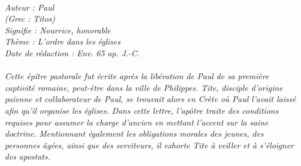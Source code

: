 \BFont
\noindent\hrulefill
{\footnotesize
\textit{
\bigskip
{\centering{}
\\Auteur : Paul
\\(Grec : Titos)
\\Signifie : Nourrice, honorable
\\Thème : L'ordre dans les églises
\\Date de rédaction : Env. 65 ap. J.-C.\\}
}
\textit{
\\Cette épître pastorale fut écrite après la libération de Paul de sa première captivité romaine, peut-être dans la ville de Philippes. Tite, disciple d'origine païenne et collaborateur de Paul, se trouvait alors en Crète où Paul l'avait laissé afin qu'il organise les églises. Dans cette lettre, l'apôtre traite des conditions requises pour assumer la charge d'ancien en mettant l'accent sur la saine doctrine. Mentionnant également les obligations morales des jeunes, des personnes âgées, ainsi que des serviteurs, il exhorte Tite à veiller et à s'éloigner des apostats.\bigskip
}
}
\par\nobreak\noindent\hrulefill

